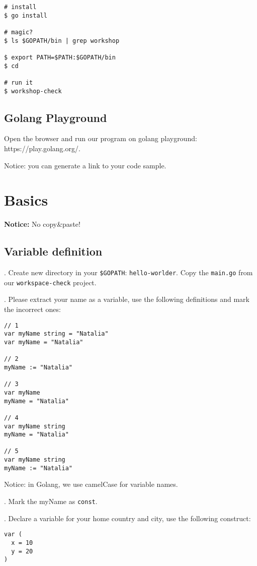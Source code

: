 \documentclass[11pt, letterpaper]{article}
\begin{document}
\begin{verbatim}
# install
$ go install

# magic?
$ ls $GOPATH/bin | grep workshop

$ export PATH=$PATH:$GOPATH/bin
$ cd

# run it
$ workshop-check
\end{verbatim}

\subsection{Golang Playground}

Open the browser and run our program on golang playground: https://play.golang.org/.

Notice: you can generate a link to your code sample.

%
\section{Basics}

\bigskip
\textbf{Notice:} No copy\&paste!
\bigskip

\subsection{Variable definition}
. Create new directory in your \verb|$GOPATH|: \verb|hello-worlder|. Copy the \verb|main.go| from our \verb|workspace-check| project.

. Please extract your name as a variable, use the following definitions and mark the incorrect ones:

\begin{verbatim}
// 1
var myName string = "Natalia"
var myName = "Natalia"

// 2
myName := "Natalia"

// 3
var myName
myName = "Natalia"

// 4
var myName string
myName = "Natalia"

// 5
var myName string
myName := "Natalia"
\end{verbatim}

Notice: in Golang, we use camelCase for variable names.

. Mark the myName as \verb|const|. 

. Declare a variable for your home country and city, use the following construct:

\begin{verbatim}
var (
  x = 10
  y = 20
)
\end{verbatim}
\end{document}

